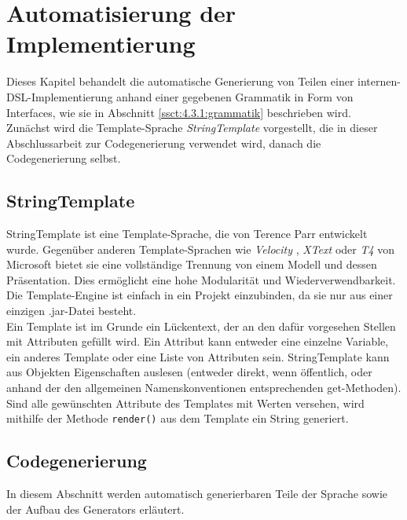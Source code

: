 
\chapter{Automatisierung der Implementierung}\label{chp:5:automatisierung}
Dieses Kapitel behandelt die automatische Generierung von Teilen einer internen-DSL-Implementierung anhand einer gegebenen Grammatik in Form von Interfaces, wie sie in Abschnitt \ref{ssct:4.3.1:grammatik} beschrieben wird.\\
Zunächst wird die Template-Sprache \emph{StringTemplate} vorgestellt, die in dieser Abschlussarbeit zur Codegenerierung verwendet wird, danach die Codegenerierung selbst.

\section{StringTemplate}\label{sct:5.1:st}
StringTemplate \cite{www:stringtemplate} ist eine Template-Sprache, die von Terence Parr entwickelt wurde. Gegenüber anderen Template-Sprachen wie \emph{Velocity} \cite{www:velocity}, \emph{XText} \cite{www:xtext} oder \emph{T4} von Microsoft \cite{www:mst4} bietet sie eine vollständige Trennung von einem Modell und dessen Präsentation. Dies ermöglicht eine hohe Modularität und Wiederverwendbarkeit. Die Template-Engine ist einfach in ein Projekt einzubinden, da sie nur aus einer einzigen .jar-Datei besteht.\\
Ein Template ist \glqq im Grunde ein Lückentext, der an den dafür vorgesehen Stellen mit Attributen gefüllt wird\grqq \cite{www:stGithub}. Ein Attribut kann entweder eine einzelne Variable, ein anderes Template oder eine Liste von Attributen sein. StringTemplate kann aus Objekten Eigenschaften auslesen (entweder direkt, wenn öffentlich, oder anhand der den allgemeinen Namenskonventionen entsprechenden get-Methoden). Sind alle gewünschten Attribute des Templates mit Werten versehen, wird mithilfe der Methode \texttt{render()} aus dem Template ein String generiert.

\section{Codegenerierung}\label{sct:5.2:codegenerierung}
In diesem Abschnitt werden automatisch generierbaren Teile der Sprache sowie der Aufbau des Generators erläutert.

